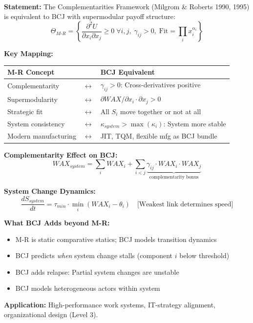 \begin{tcolorbox}[colback=green!5!white, colframe=green!75!black,
    title=Theorem BCJ-T34: Milgrom-Roberts Complementarities as Special Case]
\textbf{Statement:} The Complementarities Framework (Milgrom \& Roberts 1990, 1995) is equivalent to BCJ with supermodular payoff structure:
\begin{equation}
\Theta_{M\text{-}R} = \left\{\frac{\partial^2 U}{\partial x_i \partial x_j} \geq 0 \; \forall i,j, \; \gamma_{ij} > 0, \; \text{Fit} = \prod_i x_i^{\alpha_i}\right\}
\end{equation}

\textbf{Key Mapping:}
\begin{center}
\begin{tabular}{lcl}
\toprule
\textbf{M-R Concept} & & \textbf{BCJ Equivalent} \\
\midrule
Complementarity & $\leftrightarrow$ & $\gamma_{ij} > 0$: Cross-derivatives positive \\
Supermodularity & $\leftrightarrow$ & $\partial WAX / \partial x_i \cdot \partial x_j > 0$ \\
Strategic fit & $\leftrightarrow$ & All $S_i$ move together or not at all \\
System consistency & $\leftrightarrow$ & $\kappa_{system} > \max(\kappa_i)$: System more stable \\
Modern manufacturing & $\leftrightarrow$ & JIT, TQM, flexible mfg as BCJ bundle \\
\bottomrule
\end{tabular}
\end{center}

\textbf{Complementarity Effect on BCJ:}
\begin{equation}
WAX_{system} = \sum_i WAX_i + \sum_{i<j} \underbrace{\gamma_{ij} \cdot WAX_i \cdot WAX_j}_{\text{complementarity bonus}}
\end{equation}

\textbf{System Change Dynamics:}
\begin{equation}
\frac{dS_{system}}{dt} = \tau_{min} \cdot \min_i(WAX_i - \theta_i) \quad \text{[Weakest link determines speed]}
\end{equation}

\textbf{What BCJ Adds beyond M-R:}
\begin{itemize}[nosep]
\item M-R is static comparative statics; BCJ models transition dynamics
\item BCJ predicts \textit{when} system change stalls (component $i$ below threshold)
\item BCJ adds relapse: Partial system changes are unstable
\item BCJ models heterogeneous actors within system
\end{itemize}

\textbf{Application:} High-performance work systems, IT-strategy alignment, organizational design (Level 3).
\end{tcolorbox}

